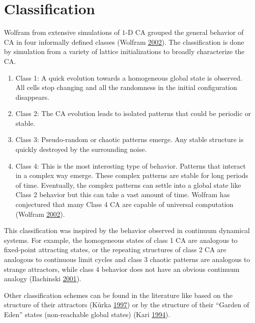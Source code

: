 \documentclass[
  12pt,
  openany]{book}
\begin{document}
\hypertarget{classification}{%
\section{Classification}\label{classification}}

Wolfram from extensive simulations of \(1\)-D CA grouped the general behavior of CA in four informally defined classes (Wolfram \protect\hyperlink{ref-wolfram2002new}{2002}). The classification is done by simulation from a variety of lattice initializations to broadly characterize the CA.

\begin{enumerate}
\def\labelenumi{\arabic{enumi}.}
\item
  Class 1: A quick evolution towards a homogeneous global state is observed. All cells stop changing and all the randomness in the initial configuration disappears.
\item
  Class 2: The CA evolution leads to isolated patterns that could be periodic or stable.
\item
  Class 3: Pseudo-random or chaotic patterns emerge. Any stable structure is quickly destroyed by the surrounding noise.
\item
  Class 4: This is the most interesting type of behavior. Patterns that interact in a complex way emerge. These complex patterns are stable for long periods of time. Eventually, the complex patterns can settle into a global state like Class 2 behavior but this can take a vast amount of time. Wolfram has conjectured that many Class 4
  CA are capable of universal computation (Wolfram \protect\hyperlink{ref-wolfram2002new}{2002}).
\end{enumerate}

This classification was inspired by the behavior observed in continuum dynamical systems. For example, the homogeneous states of class 1 CA are analogous to fixed-point attracting states, or the repeating structures of class 2 CA are analogous to continuous limit cycles and class 3 chaotic patterns are analogous to strange attractors, while class 4 behavior does not have an obvious continuum analogy (Ilachinski \protect\hyperlink{ref-ilachinski2001cellular}{2001}).

Other classification schemes can be found in the literature like based on the structure of their attractors (Kůrka \protect\hyperlink{ref-kuurka1997languages}{1997}) or by the structure of their ``Garden of Eden'' states (non-reachable global states) (Kari \protect\hyperlink{ref-kari1994reversibility}{1994}).
\end{document}

